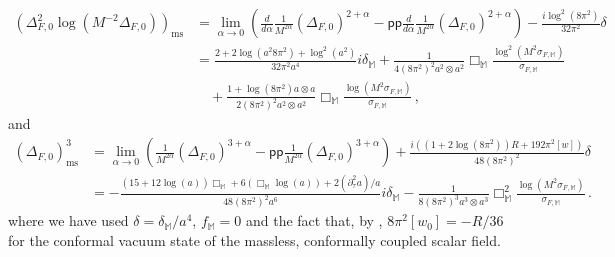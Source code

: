 \documentclass[10pt]{book}
\newcommand{\pp}{\mathsf{pp}}
\theoremstyle{break}
\begin{document}
%
\begin{align*}
\left(\Delta^2_{F,0}\log \left(M^{-2} \Delta_{F,0}\right)\right)_\text{ms}&= \lim_{\alpha\to 0}\left(\frac{d}{d\alpha}\frac{1}{M^{2\alpha}}(\Delta_{F,0})^{2+\alpha}-\pp\frac{d}{d\alpha}\frac{1}{M^{2\alpha}}(\Delta_{F,0})^{2+\alpha}\right)-\frac{i\log^2(8\pi^2)}{32\pi^2}\delta\\
%
&=\frac{2+2\log (a^2 8\pi^2)+\log^2 (a^2)}{32\pi^2 a^4}i\delta_\mathbb{M}+\frac{1}{4(8\pi^2)^2 a^2\otimes a^2}\Box_{\mathbb{M}}\frac{\log^2\left(M^2\sigma_{F,\mathbb{M}}\right)}{\sigma_{F,\mathbb{M}}}\\
%
&\quad +\frac{1+\log(8\pi^2) a\otimes a}{2(8\pi^2)^2 a^2\otimes a^2}\Box_{\mathbb{M}}\frac{\log\left(M^2\sigma_{F,\mathbb{M}}\right)}{\sigma_{F,\mathbb{M}}} \,,
\end{align*}
%
and
%
\begin{align*}
(\Delta_{F,0})^3_\text{ms}&= \lim_{\alpha\to 0}\left(\frac{1}{M^{2\alpha}}(\Delta_{F,0})^{3+\alpha}-\pp\frac{1}{M^{2\alpha}}(\Delta_{F,0})^{3+\alpha}\right)+\frac{i\left((1+2\log(8\pi^2))R+192\pi^2[w]\right)}{48(8\pi^2)^2}\delta\\
%
&=-\frac{(15+12\log (a))\Box_\mathbb{M}+6(\Box_\mathbb{M} \log (a))+2(\partial^2_\tau a)/a}{48(8\pi^2)^2a^6}i\delta_\mathbb{M}-\frac{1}{8(8\pi^2)^3 a^3\otimes a^3}\Box^2_{\mathbb{M}}\frac{\log\left(M^2\sigma_{F,\mathbb{M}}\right)}{\sigma_{F,\mathbb{M}}}\,.
\end{align*}
%
where we have used $\delta=\delta_{\mathbb{M}}/a^4$, $f_{\mathbb{M}}=0$ and the fact that, by %
, $8\pi^2[w_0]=-R/36$ for the conformal vacuum state of the massless, conformally coupled scalar field. 
\end{document}

